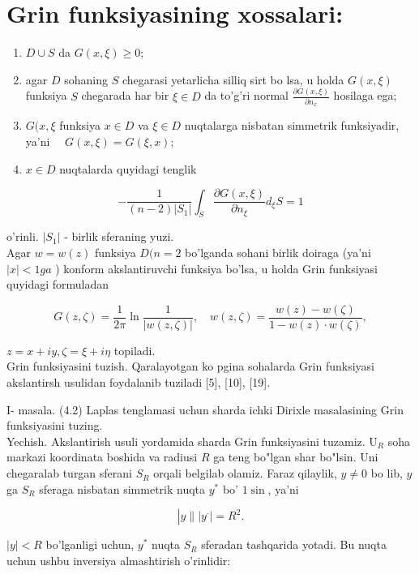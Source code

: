 \documentclass[10pt]{article}
\begin{document}
\section*{Grin funksiyasining xossalari:}
\begin{enumerate}
  \item $D \cup S$ da $G(x, \xi) \geq 0$;
  \item agar $D$ sohaning $S$ chegarasi yetarlicha silliq sirt bo lsa, u holda $G(x, \xi)$ funksiya $S$ chegarada har bir $\xi \in D$ da to'g'ri normal $\frac{\partial G(x, \xi)}{\partial n_{x}}$ hosilaga ega;
  \item $G(x, \xi$ funksiya $x \in D$ va $\xi \in D$ nuqtalarga nisbatan simmetrik funksiyadir, ya'ni $\quad G(x, \xi)=G(\xi, x)$;
  \item $x \in D$ nuqtalarda quyidagi tenglik
\end{enumerate}

$$
-\frac{1}{(n-2)\left|S_{1}\right|} \int_{S} \frac{\partial G(x, \xi)}{\partial n_{\xi}} d_{\xi} S=1
$$

o'rinli. $\left|S_{1}\right|$ - birlik sferaning yuzi.\\
Agar $w=w(z)$ funksiya $D(n=2$ bo'lganda sohani birlik doiraga (ya'ni $|x|<1 g a$ ) konform akslantiruvchi funksiya bo'lsa, u holda Grin funksiyasi quyidagi formuladan

$$
G(z, \zeta)=\frac{1}{2 \pi} \ln \frac{1}{|w(z, \zeta)|}, \quad w(z, \zeta)=\frac{w(z)-w(\zeta)}{1-w(z) \cdot w(\zeta)},
$$

$z=x+i y, \zeta=\xi+i \eta$ topiladi.\\[0pt]
Grin funksiyasini tuzish. Qaralayotgan ko pgina sohalarda Grin funksiyasi akslantirsh usulidan foydalanib tuziladi [5], [10], [19].

I- masala. (4.2) Laplas tenglamasi uchun sharda ichki Dirixle masalasining Grin funksiyasini tuzing.\\
Yechish. Akslantirish usuli yordamida sharda Grin funksiyasini tuzamiz. $\mathrm{U}_{R}$ soha markazi koordinata boshida va radiusi $R$ ga teng bo"lgan shar bo"lsin. Uni chegaralab turgan sferani $S_{R}$ orqali belgilab olamiz. Faraz qilaylik, $y \neq 0$ bo lib, $y$ ga $S_{R}$ sferaga nisbatan simmetrik nuqta $y^{*}$ bo' $1 \sin$, ya'ni


\begin{equation*}
\left|y \|\left|y^{\cdot}\right|=R^{2} .\right. \tag{4.58}
\end{equation*}


$|y|<R$ bo'lganligi uchun, $y^{*}$ nuqta $S_{R}$ sferadan tashqarida yotadi. Bu nuqta uchun ushbu inversiya almashtirish o'rinlidir:
\end{document}
